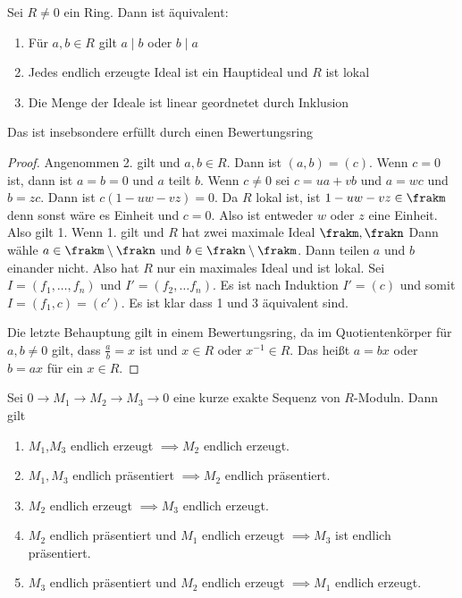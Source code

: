 \begin{Lemma}\label{Lem:IdealeTotOrd}
	Sei \(R\neq 0\) ein Ring. Dann ist äquivalent:
	\begin{enumerate}
		\item Für \(a,b\in R\) gilt \(a\mid b\) oder \(b\mid a\)
		\item Jedes endlich erzeugte Ideal ist ein Hauptideal und \(R\) ist lokal
		\item Die Menge der Ideale ist linear geordnetet durch Inklusion
	\end{enumerate}
	Das ist insebsondere erfüllt durch einen Bewertungsring
\end{Lemma}
\begin{proof}
	Angenommen 2. gilt und \(a,b\in R\). Dann ist \((a,b)=(c)\). Wenn \(c=0\) ist, dann ist \(a=b=0\) und \(a\) teilt \(b\). Wenn \(c\neq 0\) sei \(c=ua+vb\) und \(a=wc\) und \(b=zc\). Dann ist \(c(1-uw-vz)=0\). Da \(R\) lokal ist, ist \(1-uw-vz\in\frakm\) denn sonst wäre es Einheit und \(c=0\). Also ist entweder \(w\) oder \(z\) eine Einheit. Also gilt 1.
	Wenn 1. gilt und \(R\) hat zwei maximale Ideal \(\frakm,\frakn\) Dann wähle \(a\in \frakm\setminus\frakn\) und \(b\in\frakn\setminus\frakm\). Dann teilen \(a\) und \(b\) einander nicht. Also hat \(R\) nur ein maximales Ideal und ist lokal.
	Sei \(I=(f_1,\dots,f_n)\) und \(I'=(f_2,\dots f_n)\). Es ist nach Induktion \(I'=(c)\) und somit \(I=(f_1,c)=(c')\).
	Es ist klar dass 1 und 3 äquivalent sind.
	
	Die letzte Behauptung gilt in einem Bewertungsring, da im Quotientenkörper für \(a,b\neq 0\) gilt, dass \(\frac a b=x\) ist und \(x\in R\) oder \(x^{-1}\in R\). Das heißt \(a=bx\) oder \(b=ax\) für ein \(x\in R\).
\end{proof}
\begin{Lemma}\label{Lem:ExSeqEndlPrä}
	Sei \(0\to M_1\to M_2\to M_3\to 0\) eine kurze exakte Sequenz von \(R\)-Moduln. Dann gilt
	\begin{enumerate}
		\item \(M_1\),\(M_3\) endlich erzeugt \(\implies M_2\) endlich erzeugt.
		\item \(M_1,M_3\) endlich präsentiert \(\implies M_2\) endlich präsentiert.
		\item \(M_2\) endlich erzeugt \(\implies M_3\) endlich erzeugt.
		\item \(M_2\) endlich präsentiert und \(M_1\) endlich erzeugt \(\implies M_3\) ist endlich präsentiert.
		\item \(M_3\) endlich präsentiert und \(M_2\) endlich erzeugt \(\implies M_1\) endlich erzeugt.
	\end{enumerate}
\end{Lemma}
